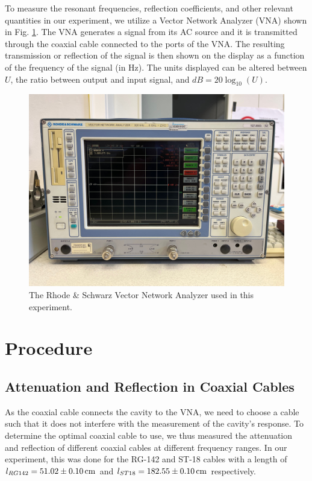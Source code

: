 \documentclass[a4paper]{article}
\numberwithin{equation}{section}
\begin{document}
To measure the resonant frequencies, reflection coefficients, and other relevant
quantities in our experiment, we utilize a Vector Network Analyzer (VNA) shown
in Fig. \ref*{fig:VNA}. The VNA generates a signal from its AC source and it is
transmitted through the coaxial cable connected to the ports of the VNA. The
resulting transmission or reflection of the signal is then shown on the display
as a function of the frequency of the signal (in Hz). The units displayed can be
altered between $U$, the ratio between output and input signal, and $dB = 20
\log_{10}(U)$. \par  

\begin{figure}
	\centering
	\includegraphics[width=0.8\columnwidth]{VNA.jpg}
	\caption{The Rhode \& Schwarz Vector Network Analyzer used in this experiment.}

	\label{fig:VNA}
\end{figure}

\section{Procedure}

\subsection{Attenuation and Reflection in Coaxial Cables}

As the coaxial cable connects the cavity to the VNA, we need to choose a cable
such that it does not interfere with the measurement of the cavity's response.
To determine the optimal coaxial cable to use, we thus measured the attenuation
and reflection of different coaxial cables at different frequency ranges. In our
experiment, this was done for the RG-142 and ST-18 cables with a length of
$l_{RG142}=\SI{51.02 \pm 0.10}{\centi\meter}$ and 
$l_{ST18}=\SI{182.55 \pm 0.10}{\centi\meter}$ respectively. \par
\end{document}
